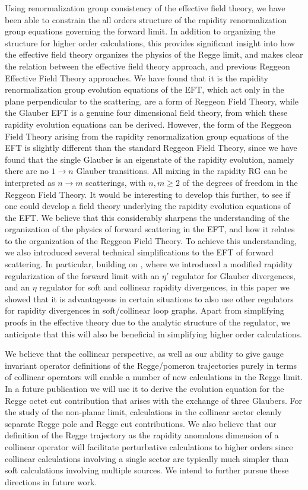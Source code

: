 \documentclass[letterpaper,11pt]{article}
\begin{document}
Using renormalization group consistency of the effective field theory, we have been able to constrain the all orders structure of the rapidity renormalization group equations governing the forward limit. In addition to organizing the structure for higher order calculations, this provides significant insight into how the effective field theory organizes the physics of the Regge limit, and makes clear the relation between the effective field theory approach, and previous Reggeon Effective Field Theory approaches. We have found that it is the rapidity renormalization group evolution equations of the EFT, which act only in the plane perpendicular to the scattering, are a form of Reggeon Field Theory, while the Glauber EFT is a genuine four dimensional field theory, from which these rapidity evolution equations can be derived. However, the form of the Reggeon Field Theory arising from the rapidity renormalization group equations of the EFT is slightly different than the standard Reggeon Field Theory,  since we have found that the single Glauber is an eigenstate of the rapidity evolution, namely there are no $1\to n$ Glauber transitions. All mixing in the rapidity RG can be interpreted as $n\to m$ scatterings, with $n,m\geq 2$ of the degrees of freedom in the Reggeon Field Theory. It would be interesting to develop this further, to see if one could develop a field theory underlying the rapidity evolution equations of the EFT. We believe that this considerably sharpens the understanding of the organization of the physics of forward scattering in the EFT, and how it relates to the organization of the Reggeon Field Theory. To achieve this understanding, we also introduced several technical simplifications to the EFT of forward scattering. In particular, building on \cite{Moult:2022lfy}, where we introduced a modified rapidity regularization of the forward limit with an  $\eta'$ regulator for Glauber divergences, and an $\eta$ regulator for soft and collinear rapidity divergences, in this paper we showed that it is advantageous in certain situations to also use other regulators for rapidity divergences in soft/collinear loop graphs.
Apart from simplifying proofs in the effective theory due to the analytic structure of the regulator, we anticipate that this will also be beneficial in simplifying higher order calculations.


We believe that the collinear perspective, as well as our ability to give gauge invariant operator definitions of the Regge/pomeron trajectories purely in terms of collinear operators will enable a number of new calculations in the Regge limit. In a future publication we will use it to derive the evolution equation for the Regge octet cut contribution that arises with the exchange of three Glaubers. For the study of the non-planar limit, calculations in the collinear sector cleanly separate Regge pole and Regge cut contributions. We also believe that our definition of the Regge trajectory as the rapidity anomalous dimension of a collinear operator will facilitate perturbative calculations to higher orders since collinear calculations involving a single sector are typically much simpler than soft calculations involving multiple sources. We intend to further pursue these directions in future work.
\end{document}
